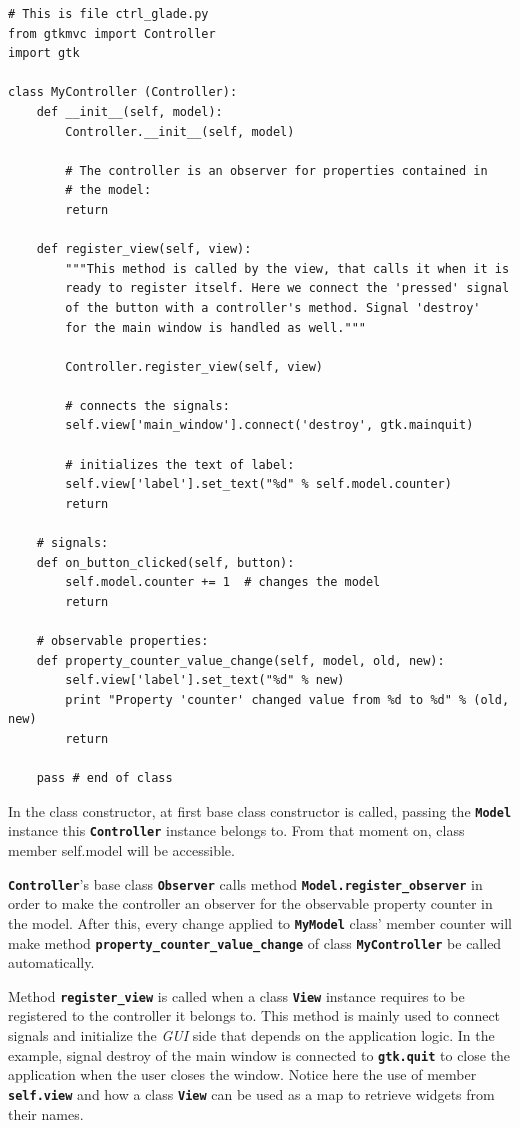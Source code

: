 \documentclass{article}
\newcommand{\kw}[1]{\emph{#1}\xspace}
\newcommand{\gui}{\kw{GUI}}
\newcommand{\codename}[1]{\texttt{\bfseries \textcolor {codecolor}{#1}}\xspace}
\newcommand{\codesize}{\small \color{codecolor}}
\begin{document}
{ \codesize 
\begin{verbatim}   
# This is file ctrl_glade.py
from gtkmvc import Controller
import gtk

class MyController (Controller):
    def __init__(self, model):
        Controller.__init__(self, model)

        # The controller is an observer for properties contained in
        # the model:
        return

    def register_view(self, view):
        """This method is called by the view, that calls it when it is
        ready to register itself. Here we connect the 'pressed' signal
        of the button with a controller's method. Signal 'destroy'
        for the main window is handled as well."""

        Controller.register_view(self, view)

        # connects the signals:
        self.view['main_window'].connect('destroy', gtk.mainquit)
        
        # initializes the text of label:
        self.view['label'].set_text("%d" % self.model.counter)
        return
       
    # signals:
    def on_button_clicked(self, button):
        self.model.counter += 1  # changes the model
        return

    # observable properties:
    def property_counter_value_change(self, model, old, new):
        self.view['label'].set_text("%d" % new)
        print "Property 'counter' changed value from %d to %d" % (old, new)
        return
    
    pass # end of class
\end{verbatim}
} 

In the class constructor, at first base class constructor is called,
passing the \codename{Model} instance this \codename{Controller}
instance belongs to. From that moment on, class member self.model will
be accessible.

\codename{Controller}'s base class \codename{Observer} calls method
\codename{Model.register\_observer} in order to make the controller an
observer for the observable property counter in the model. After this,
every change applied to \codename{MyModel} class' member counter will
make method \codename{property\_counter\_value\_change} of class
\codename{MyController} be called automatically.

Method \codename{register\_view} is called when a class
\codename{View} instance requires to be registered to the controller
it belongs to.  This method is mainly used to connect signals and
initialize the \gui side that depends on the application logic. In the
example, signal destroy of the main window is connected to
\codename{gtk.quit} to close the application when the user closes the
window. Notice here the use of member \codename{self.view} and how a
class \codename{View} can be used as a map to retrieve widgets from
their names.
\end{document}
